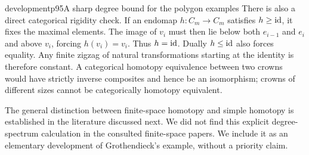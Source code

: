 \begin{dcomment}{development}{p95}{A sharp degree bound for the polygon examples}
There is also a direct categorical rigidity check. If an endomap $h:C_m\to C_m$ satisfies $h\geq\mathrm{id}$, it fixes the maximal elements. The image of $v_i$ must then lie below both $e_{i-1}$ and $e_i$ and above $v_i$, forcing $h(v_i)=v_i$. Thus $h=\mathrm{id}$. Dually $h\leq\mathrm{id}$ also forces equality. Any finite zigzag of natural transformations starting at the identity is therefore constant. A categorical homotopy equivalence between two crowns would have strictly inverse composites and hence be an isomorphism; crowns of different sizes cannot be categorically homotopy equivalent.

The general distinction between finite-space homotopy and simple homotopy is established in the literature discussed next. We did not find this explicit degree-spectrum calculation in the consulted finite-space papers. We include it as an elementary development of Grothendieck's example, without a priority claim.
\end{dcomment}



